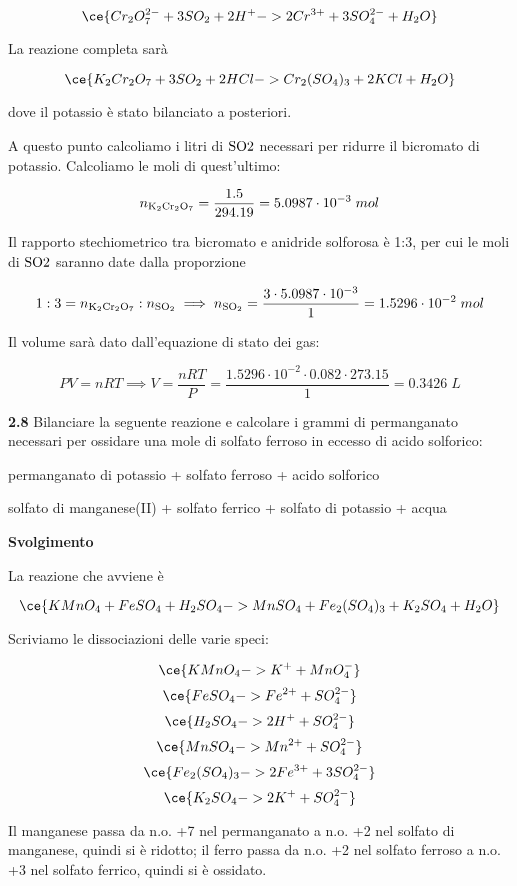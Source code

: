 $$\ce{Cr_2O_7^{2-} + 3SO_2 + 2H^+ -> 2Cr^{3+} + 3SO_4^{2-} + H_2O}$$

La reazione completa sarà

$$\ce{K_2Cr_2O_7 + 3SO_2 + 2HCl -> Cr_2(SO_4)_3 + 2KCl + H_2O}$$

dove il potassio è stato bilanciato a posteriori.

A questo punto calcoliamo i litri di $\rm SO2$ necessari per ridurre il bicromato di potassio. Calcoliamo le moli di quest'ultimo:

$$n_{\rm K_2Cr_2O_7}=\frac{1.5}{294.19}
=5.0987 \cdot 10^{-3}\;mol$$

Il rapporto stechiometrico tra bicromato e anidride solforosa è 1:3, per cui le moli di $\rm SO2$ saranno date dalla proporzione

$$1:3=n_{\rm K_2Cr_2O_7}:n_{\rm SO_2}
\implies
n_{\rm SO_2}=\frac{3 \cdot 5.0987 \cdot 10^{-3}}{1}
=1.5296 \cdot 10^{-2}\;mol$$

Il volume sarà dato dall'equazione di stato dei gas:

$$PV=nRT
\implies
V=\frac{nRT}{P}=\frac{1.5296 \cdot 10^{-2} \cdot 0.082 \cdot 273.15}{1}=0.3426\;L$$



\vspace{0.2cm}\textbf{2.8} Bilanciare la seguente reazione e calcolare i grammi di permanganato necessari per ossidare una
mole di solfato ferroso in eccesso di acido solforico:

\begin{center}
permanganato di potassio + solfato ferroso + acido solforico \ce{->}

\ce{->}solfato di manganese(II) + solfato ferrico + solfato di potassio + acqua
\end{center}

\large\textbf{Svolgimento}\normalsize

\vspace{0.2cm}La reazione che avviene è

$$\ce{KMnO_4 + FeSO_4 + H_2SO_4 -> MnSO_4 + Fe_2(SO_4)_3 + K_2SO_4 + H_2O}$$

Scriviamo le dissociazioni delle varie speci:

$$\ce{KMnO_4 -> K^+ + MnO_4^-}$$
$$\ce{FeSO_4 -> Fe^{2+} + SO_4^{2-}}$$
$$\ce{H_2SO_4 -> 2H^+ + SO_4^{2-}}$$
$$\ce{MnSO_4 -> Mn^{2+} + SO_4^{2-}}$$
$$\ce{Fe_2(SO_4)_3 -> 2Fe^{3+} + 3SO_4^{2-}}$$
$$\ce{K_2SO_4 -> 2K^+ + SO_4^{2-}}$$

Il manganese passa da n.o. +7 nel permanganato a n.o. +2 nel solfato di manganese, quindi si è ridotto; il ferro passa da n.o. +2 nel solfato ferroso a n.o. +3 nel solfato ferrico, quindi si è ossidato.

